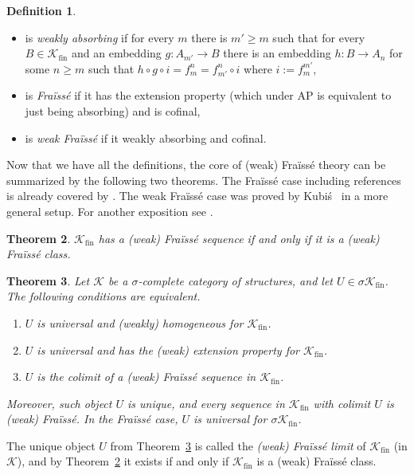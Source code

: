 \documentclass[oneside,notitlepage,12pt]{article}
\newtheorem{tw}{Theorem}[section]
\theoremstyle{definition}
\newtheorem{df}[tw]{Definition}
\theoremstyle{remark}
\newcommand \maps {\colon} %
\newcommand \cmp {\circ} %
\newcommand \sig {\sigma}
\newcommand \K {\mathscr{K}}
\newcommand \fin {{\operatorname{fin}}}
\begin{document}
\begin{df}
\begin{itemize}
    \item is \emph{weakly absorbing} if for every $m$ there is $m' \geq m$ such that for every $B \in \K_\fin$ and an embedding $g\maps A_{m'} \to B$ there is an embedding $h\maps B \to A_n$ for some $n \geq m$ such that  $h \cmp g \cmp i = f^n_m = f^n_{m'} \cmp i$ where $i := f^{m'}_m$,
    
    \item is \emph{Fraïssé} if it has the extension property (which under AP is equivalent to just being absorbing) and is cofinal,

    \item is \emph{weak Fraïssé} if it weakly absorbing and cofinal.
\end{itemize}
\end{df}

Now that we have all the definitions, the core of (weak) Fraïssé theory can be summarized by the following two theorems.
The Fraïssé case including references is already covered by \cite[Theorems~3.2 and 3.3]{paper1}.
The weak Fraïssé case was proved by Kubiś~\cite[Theorems~3.7, 4.2 and 5.1]{KubWeakFraisse} in a more general setup.
For another exposition see \cite[Section~2.2]{BBDK}.

\begin{tw} \label{thm:Fclass}
    $\K_\fin$ has a (weak) Fraïssé sequence if and only if it is a (weak) Fraïssé class.
\end{tw}

\begin{tw} \label{thm:Flim}
    Let $\K$ be a $\sigma$-complete category of structures, and let $U \in \sig\K_\fin$.
    The following conditions are equivalent.
    \begin{enumerate}
        \item $U$ is universal and (weakly) homogeneous for $\K_\fin$.
        \item $U$ is universal and has the (weak) extension property for $\K_\fin$.
        \item $U$ is the colimit of a (weak) Fraïssé sequence in $\K_\fin$.
    \end{enumerate}
    Moreover, such object $U$ is unique, and every sequence in $\K_\fin$ with colimit $U$ is (weak) Fraïssé.
    In the Fraïssé case, $U$ is universal for $\sig\K_\fin$.
\end{tw}

The unique object $U$ from Theorem~\ref{thm:Flim} is called the \emph{(weak) Fraïssé limit} of $\K_\fin$ (in $\K$), and by Theorem~\ref{thm:Fclass} it exists if and only if $\K_\fin$ is a (weak) Fraïssé class.
\end{document}
